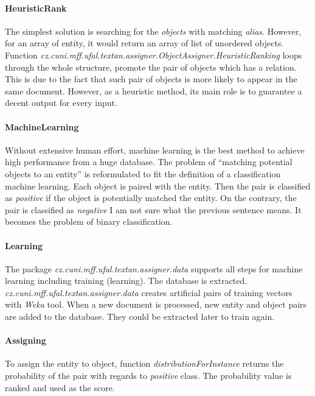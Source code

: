 \paragraph{HeuristicRank}
The simplest solution is searching for the \textit{objects} with matching 
\textit{alias}. However, for an array of entity, it would return an array of 
list of unordered objects. Function
\emph{cz.\-cuni.\-mff.\-ufal.\-textan.\-assigner.\-ObjectAssigner.\-HeuristicRanking}
loops through the whole structure, promote the pair of objects which has a
relation. This is due to the fact that such pair of objects is more likely to
appear in the same document. However, as a heuristic method, its main role is to
guarantee a decent output for every input.


\paragraph{MachineLearning}
Without extensive human effort, machine learning is the best method to achieve
high performance from a huge database. The problem of ``matching potential
objects to an entity'' is reformulated to fit the definition of a classification
machine learning. Each object is paired with the entity. Then the pair is
classified as \emph{positive} if the object is potentially matched the entity.
On the contrary, the pair is classified as \emph{negative} 
{I am not sure what the previous sentence means}. It becomes the
problem of binary classification.


\paragraph{Learning}
The package \emph{cz.\-cuni.\-mff.\-ufal.\-textan.\-assigner.\-data} supports all steps for
machine learning including training (learning). The database is extracted. 
\emph{cz.\-cuni.\-mff.\-ufal.\-textan.\-assigner.\-data} creates artificial pairs of
training vectors with \textit{Weka} tool. When a new document is processed,
new entity and object pairs are added to the database. They could be extracted
later to train again.

\paragraph{Assigning}
To assign the entity to object, function \emph{distributionForInstance} returns
the probability of the pair with regards to \emph{positive} class. The
probability value is ranked and used as the score.

